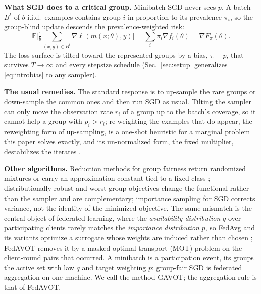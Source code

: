 \documentclass{article}
\theoremstyle{definition}
\newcommand{\E}{\mathbb{E}}
\newcommand{\avot}{\textsf{GAVOT}}
\begin{document}
\noindent\textbf{What SGD does to a critical group.}
Minibatch SGD never sees $p$. A batch $B^t$ of $b$ i.i.d.\ examples contains
group $i$ in proportion to its prevalence $\pi_i$, so the group-blind update
descends the prevalence-weighted risk:
\begin{equation}
\E\Big[\tfrac1b\!\sum_{(x,y)\in B^t}\!\nabla\ell(m(x;\theta),y)\Big]
=\sum_i\pi_i\nabla f_i(\theta)=\nabla F_\pi(\theta).
\label{eq:introbias}
\end{equation}
The loss surface is tilted toward the represented groups by a bias, $\pi-p$,
that survives $T\to\infty$ and every stepsize schedule (Sec.~\ref{sec:setup}
generalizes \eqref{eq:introbias} to any sampler).

\noindent\textbf{The usual remedies.}
The standard response is to up-sample the rare groups or down-sample the
common ones and then run SGD as usual. Tilting the sampler can only move the
observation rate $r_i$ of a group up to the batch's coverage, so it cannot
help a group with $p_i>r_i$; re-weighting the examples that do appear, the
reweighting form of up-sampling, is a one-shot heuristic for a marginal
problem this paper solves exactly, and its un-normalized form, the fixed
multiplier, destabilizes the iterates
\cite{rahimi2025fedavot}.

\noindent\textbf{Other algorithms.}
Reduction methods for group fairness return randomized mixtures or carry an
approximation constant tied to a fixed class
\cite{agarwal2018reductions,cotter2019twoplayer,chamon2020pacc,chamon2023nonconvex};
distributionally robust and worst-group objectives
\cite{sagawa2020dro,hashimoto2018repeated,levy2020large,namkoong2017variance,curi2020adaptive} change the functional
rather than the sampler and are complementary; importance sampling for SGD
\cite{rizk2021importance,katharopoulos2018not} corrects variance, not the
identity of the minimized objective. The same mismatch is the central object
of federated learning, where the \emph{availability distribution} $q$ over
participating clients rarely matches the \emph{importance distribution} $p$,
so \textsf{FedAvg} \cite{mcmahan2017fedavg} and its variants
\cite{li2020fedprox,karimireddy2020scaffold} optimize a surrogate whose
weights are induced rather than chosen
\cite{rahimi2025agnostic,wang2020objective,cho2022biased};
\textsf{FedAVOT} \cite{rahimi2025fedavot} removes it by a masked optimal
transport (MOT) problem on the client-round pairs that occurred. A minibatch
is a participation event, its groups the active set with law $q$ and target
weighting $p$: group-fair SGD is federated aggregation on one machine. We call the
method \avot{}; the aggregation rule is that of \textsf{FedAVOT}.
\end{document}
